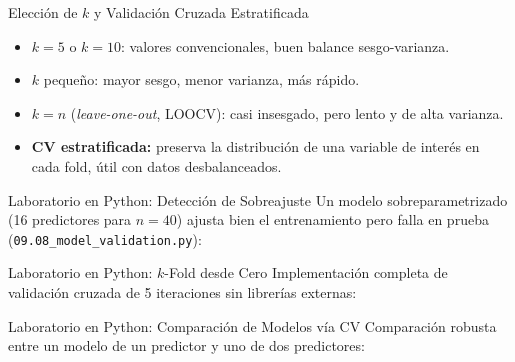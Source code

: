 \documentclass[10pt, aspectratio=169]{beamer}
\begin{document}
\begin{frame}{Elección de $k$ y Validación Cruzada Estratificada}
  \footnotesize
  \begin{itemize}\itemsep=0.1cm
    \item $k=5$ o $k=10$: valores convencionales, buen balance sesgo-varianza. \pause
    \item $k$ pequeño: mayor sesgo, menor varianza, más rápido. \pause
    \item $k=n$ (\emph{leave-one-out}, LOOCV): casi insesgado, pero lento y de alta varianza. \pause
    \item \textbf{CV estratificada:} preserva la distribución de una variable de interés en cada fold, útil con datos desbalanceados.
  \end{itemize}
\end{frame}

\begin{frame}[fragile]{Laboratorio en Python: Detección de Sobreajuste}
  \scriptsize
  Un modelo sobreparametrizado (16 predictores para $n=40$) ajusta bien el entrenamiento pero falla en prueba (\texttt{09.08\_model\_validation.py}):
  {
  }
\end{frame}

\begin{frame}[fragile]{Laboratorio en Python: $k$-Fold desde Cero}
  \scriptsize
  Implementación completa de validación cruzada de 5 iteraciones sin librerías externas:
  {
  }
\end{frame}

\begin{frame}[fragile]{Laboratorio en Python: Comparación de Modelos vía CV}
  \scriptsize
  Comparación robusta entre un modelo de un predictor y uno de dos predictores:
  {
  }
\end{frame}
\end{document}
